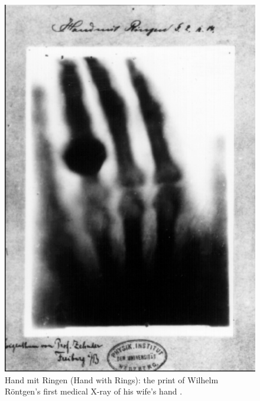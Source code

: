 \begin{figure}[h]
    \centering
    \includegraphics[keepaspectratio=true, scale=0.6]{./fig/first_medical_xray}
    \vspace*{3mm}
    \caption{Hand mit Ringen (Hand with Rings): the print of Wilhelm Röntgen's first medical X-ray of his wife's hand \cite{HandMitRingen}.}
    \label{fig:first_medical_xray}
\end{figure}

